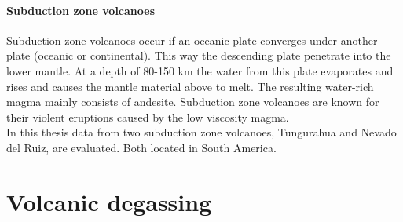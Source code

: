 \documentclass  [
  paper    = a4,
  BCOR     = 10mm,
  twoside,
  fontsize = 12pt,
  fleqn,
  toc      = bibnumbered,
  toc      = listofnumbered,
  numbers  = noendperiod,
  headings = normal,
  listof   = leveldown,
  version  = 3.03
]                                       {scrreprt}
\begin{document}
\paragraph{ Subduction zone volcanoes}
Subduction zone volcanoes occur if an oceanic plate converges under another plate (oceanic or continental). This way the descending plate penetrate into the lower mantle. At a depth of 80-150 km the water from this plate evaporates and rises and causes the mantle material above to melt. The resulting water-rich magma mainly consists of andesite. Subduction zone volcanoes are known for their violent eruptions caused by the low viscosity magma.\\
In this thesis data from two subduction zone volcanoes, Tungurahua and Nevado del Ruiz, are evaluated. Both located in South America.
\section{Volcanic degassing}
\end{document}

